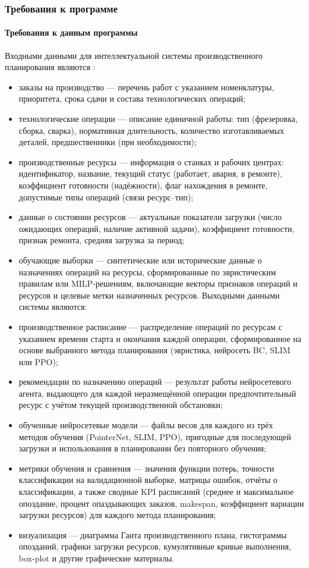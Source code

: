 \subsubsection{Требования к программе}

\paragraph{Требования к данным программы}

Входными данными для интеллектуальной системы производственного планирования являются \cite{setiavtomat}:
\begin{itemize}
\item заказы на производство — перечень работ с указанием номенклатуры, приоритета, срока сдачи и состава технологических операций;
\item технологические операции — описание единичной работы: тип (фрезеровка, сборка, сварка), нормативная длительность, количество изготавливаемых деталей, предшественники (при необходимости);
\item производственные ресурсы — информация о станках и рабочих центрах: идентификатор, название, текущий статус (работает, авария, в ремонте), коэффициент готовности (надёжности), флаг нахождения в ремонте, допустимые типы операций (связи ресурс–тип);
\item данные о состоянии ресурсов — актуальные показатели загрузки (число ожидающих операций, наличие активной задачи), коэффициент готовности, признак ремонта, средняя загрузка за период;
\item обучающие выборки — синтетические или исторические данные о назначениях операций на ресурсы, сформированные по эвристическим правилам или MILP-решениям, включающие векторы признаков операций и ресурсов и целевые метки назначенных ресурсов.
Выходными данными системы являются:
\item производственное расписание — распределение операций по ресурсам с указанием времени старта и окончания каждой операции, сформированное на основе выбранного метода планирования (эвристика, нейросеть BC, SLIM или PPO);
\item рекомендации по назначению операций — результат работы нейросетевого агента, выдающего для каждой неразмещённой операции предпочтительный ресурс с учётом текущей производственной обстановки;
\item обученные нейросетевые модели — файлы весов для каждого из трёх методов обучения (PointerNet, SLIM, PPO), пригодные для последующей загрузки и использования в планировании без повторного обучения;
\item метрики обучения и сравнения — значения функции потерь, точности классификации на валидационной выборке, матрицы ошибок, отчёты о классификации, а также сводные KPI расписаний (среднее и максимальное опоздание, процент опаздывающих заказов, makespan, коэффициент вариации загрузки ресурсов) для каждого метода планирования; 
\item визуализация — диаграмма Ганта производственного плана, гистограммы опозданий, графики загрузки ресурсов, кумулятивные кривые выполнения, box‑plot и другие графические материалы.
\end{itemize}

